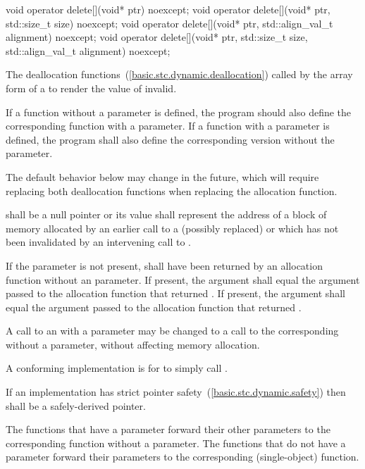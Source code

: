 %
\begin{itemdecl}
void operator delete[](void* ptr) noexcept;
void operator delete[](void* ptr, std::size_t size) noexcept;
void operator delete[](void* ptr, std::align_val_t alignment) noexcept;
void operator delete[](void* ptr, std::size_t size, std::align_val_t alignment) noexcept;
\end{itemdecl}

\begin{itemdescr}
\pnum
\effects
The
deallocation functions~(\ref{basic.stc.dynamic.deallocation})
called by the array form of a
to render the value of  invalid.

\pnum
\replaceable
{}
If a function without a  parameter is defined,
the program should also define
the corresponding function with a  parameter.
If a function with a  parameter is defined,
the program shall also define
the corresponding version without the  parameter.
\begin{note}
The default behavior below may change in the future, which will require
replacing both deallocation functions when replacing the allocation function.
\end{note}

\pnum
\requires
{} shall be a null pointer or
its value shall represent the address of
a block of memory allocated by
an earlier call to a (possibly replaced)
or
which has not been invalidated by an intervening call to
.

\pnum
\requires
If the  parameter is not present,
 shall have been returned by an allocation function
without an  parameter.
If present, the  argument
shall equal the  argument
passed to the allocation function that returned . 
If present, the  argument
shall equal the  argument
passed to the allocation function that returned .

\pnum
\required
A call to an 
with a  parameter
may be changed to
a call to the corresponding 
without a  parameter,
without affecting memory allocation.
\begin{note} A conforming implementation is for
 to simply call
. \end{note}

\pnum
\requires
If an implementation has strict pointer safety~(\ref{basic.stc.dynamic.safety})
then  shall be a safely-derived pointer.

\pnum
{}
The functions that have a  parameter
forward their other parameters
to the corresponding function without a  parameter.
The functions that do not have a  parameter
forward their parameters
to the corresponding  (single-object) function.
\end{itemdescr}

